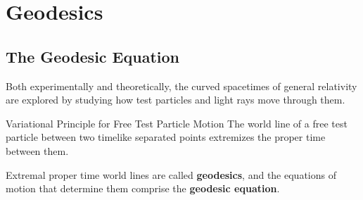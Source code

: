 %
%
%
\chapter{Geodesics}
\label{geod} %




\section{The Geodesic Equation}
\label{sec:geodEq}

Both experimentally and theoretically, the curved spacetimes of general relativity are explored by studying how test particles and light rays move through them.

\begin{nthm}{Variational Principle for Free Test Particle Motion}
    The world line of a free test particle between two timelike separated points extremizes the proper time between them.
\end{nthm}

Extremal proper time world lines are called \textbf{geodesics}, and the equations of motion that determine them comprise the \textbf{geodesic equation}.

